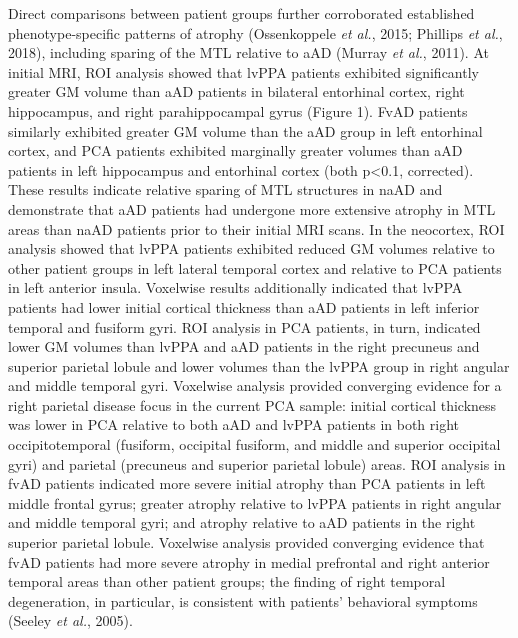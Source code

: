 \documentclass[]{article}
\begin{document}
Direct comparisons between patient groups further corroborated
established phenotype-specific patterns of atrophy (Ossenkoppele
\emph{et al.}, 2015; Phillips \emph{et al.}, 2018), including sparing of
the MTL relative to aAD (Murray \emph{et al.}, 2011). At initial MRI,
ROI analysis showed that lvPPA patients exhibited significantly greater
GM volume than aAD patients in bilateral entorhinal cortex, right
hippocampus, and right parahippocampal gyrus (Figure 1). FvAD patients
similarly exhibited greater GM volume than the aAD group in left
entorhinal cortex, and PCA patients exhibited marginally greater volumes
than aAD patients in left hippocampus and entorhinal cortex (both
p\textless{}0.1, corrected). These results indicate relative sparing of
MTL structures in naAD and demonstrate that aAD patients had undergone
more extensive atrophy in MTL areas than naAD patients prior to their
initial MRI scans. In the neocortex, ROI analysis showed that lvPPA
patients exhibited reduced GM volumes relative to other patient groups
in left lateral temporal cortex and relative to PCA patients in left
anterior insula. Voxelwise results additionally indicated that lvPPA
patients had lower initial cortical thickness than aAD patients in left
inferior temporal and fusiform gyri. ROI analysis in PCA patients, in
turn, indicated lower GM volumes than lvPPA and aAD patients in the
right precuneus and superior parietal lobule and lower volumes than the
lvPPA group in right angular and middle temporal gyri. Voxelwise
analysis provided converging evidence for a right parietal disease focus
in the current PCA sample: initial cortical thickness was lower in PCA
relative to both aAD and lvPPA patients in both right occipitotemporal
(fusiform, occipital fusiform, and middle and superior occipital gyri)
and parietal (precuneus and superior parietal lobule) areas. ROI
analysis in fvAD patients indicated more severe initial atrophy than PCA
patients in left middle frontal gyrus; greater atrophy relative to lvPPA
patients in right angular and middle temporal gyri; and atrophy relative
to aAD patients in the right superior parietal lobule. Voxelwise
analysis provided converging evidence that fvAD patients had more severe
atrophy in medial prefrontal and right anterior temporal areas than
other patient groups; the finding of right temporal degeneration, in
particular, is consistent with patients' behavioral symptoms (Seeley
\emph{et al.}, 2005).
\end{document}
